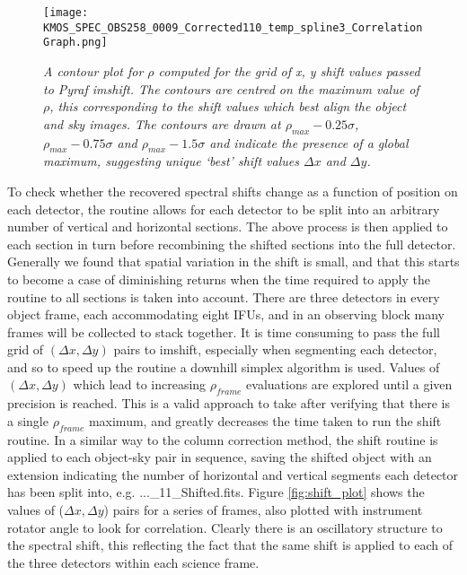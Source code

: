 \documentclass{literature}
\begin{document}
       
\begin{figure}[!htp]
\centering
\texttt{[image: KMOS\_SPEC\_OBS258\_0009\_Corrected110\_temp\_spline3\_CorrelationGraph.png]}
\caption{\footnotesize{\emph{A contour plot for $\rho$ computed for the grid of x, y shift values passed to Pyraf imshift. The contours are centred on the maximum value of $\rho$, this corresponding to the shift values which best align the object and sky images. The contours are drawn at $\rho _{max} - 0.25\sigma$, $\rho _{max} - 0.75\sigma$ and $\rho _{max} - 1.5\sigma$ and indicate the presence of a global maximum, suggesting unique `best' shift values $\Delta x$ and $\Delta y$.}}}
\label{fig:rho_plot}
\end{figure}

To check whether the recovered spectral shifts change as a function of position on each detector, the routine allows for each detector to be split into an arbitrary number of vertical and horizontal sections. The above process is then applied to each section in turn before recombining the shifted sections into the full detector. Generally we found that spatial variation in the shift is small, and that this starts to become a case of diminishing returns when the time required to apply the routine to all sections is taken into account. There are three detectors in every object frame, each accommodating eight IFUs, and in an observing block many frames will be collected to stack together. It is time consuming to pass the full grid of $(\Delta x, \Delta y)$ pairs to imshift, especially when segmenting each detector, and so to speed up the routine a downhill simplex algorithm is used. Values of $(\Delta x, \Delta y)$ which lead to increasing $\rho_{frame}$ evaluations are explored until a given precision is reached. This is a valid approach to take after verifying that there is a single $\rho_{frame}$ maximum, and greatly decreases the time taken to run the shift routine. In a similar way to the column correction method, the shift routine is applied to each object-sky pair in sequence, saving the shifted object with an extension indicating the number of horizontal and vertical segments each detector has been split into, e.g. ...\_11\_Shifted.fits. Figure \ref{fig:shift_plot} shows the values of ($\Delta x, \Delta y$) pairs for a series of frames, also plotted with instrument rotator angle to look for correlation. Clearly there is an oscillatory structure to the spectral shift, this reflecting the fact that the same shift is applied to each of the three detectors within each science frame. \\ 
\end{document}
